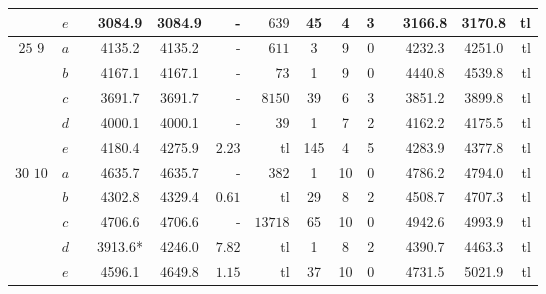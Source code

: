 \begin{table}[!htb]
\begin{tabular}{cccccrrccccccr}
& $e$ & & 3084.9 & 3084.9 & - & $639$ & 45 & 4 & 3 & & 3166.8 & 3170.8 & tl \\
\hline
\multirow{5}{*}{$25$  \hspace{5mm} $9$}
& $a$ & & 4135.2 & 4135.2 & - & $611$ & 3 & 9 & 0 & & 4232.3 & 4251.0 & tl \\
& $b$ & & 4167.1 & 4167.1 & - & $73$ & 1 & 9 & 0 & & 4440.8 & 4539.8 & tl \\
& $c$ & & 3691.7 & 3691.7 & - & $8150$ & 39 & 6 & 3 & & 3851.2 & 3899.8 & tl \\
& $d$ & & 4000.1 & 4000.1 & - & $39$ & 1 & 7 & 2 & & 4162.2 & 4175.5 & tl \\
& $e$ & & 4180.4 & 4275.9 & $2.23$ & tl & 145 & 4 & 5 & & 4283.9 & 4377.8 & tl \\
\hline
\multirow{5}{*}{$30$  \hspace{4mm} $10$}
& $a$ & & 4635.7 & 4635.7 & - & $382$ & 1 & 10 & 0 & & 4786.2 & 4794.0 & tl \\
& $b$ & & 4302.8 & 4329.4 & $0.61$ & tl & 29 & 8 & 2 & & 4508.7 & 4707.3 & tl \\
& $c$ & & 4706.6 & 4706.6 & - & $13718$ & 65 & 10 & 0 & & 4942.6 & 4993.9 & tl \\
& $d$ & & 3913.6* & 4246.0 & $7.82$ & tl & 1 & 8 & 2 & & 4390.7 & 4463.3 & tl \\
& $e$ & & 4596.1 & 4649.8 & $1.15$ & tl & 37 & 10 & 0 & & 4731.5 & 5021.9 & tl \\
\hline
\end{tabular}
\label{tab:PDPCDxVRPCD-custo20}
\end{table}
